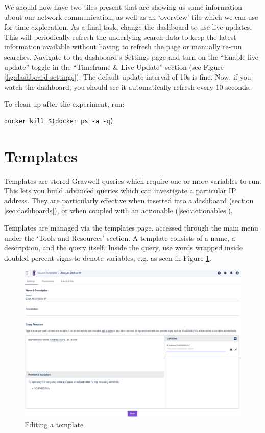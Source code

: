 We should now have two tiles present that are showing us some information
about our network communication, as well as an `overview' tile which we
can use for time exploration. As a final task, change the dashboard to use
live updates. This will periodically refresh the underlying search data
to keep the latest information available without having to refresh the
page or manually re-run searches. Navigate to the dashboard's Settings
page and turn on the ``Enable live update'' toggle in the ``Timeframe
\& Live Update'' section (see Figure \ref{fig:dashboard-settings}). The default update interval of 10s is fine.
Now, if you watch the dashboard, you should see it automatically refresh
every 10 seconds.

To clean up after the experiment, run:

\begin{Verbatim}[breaklines=true]
docker kill $(docker ps -a -q)
\end{Verbatim}

\clearpage
\section{Templates}
Templates are stored Gravwell queries which require one or more variables to run. This lets you build advanced queries which can investigate a particular IP address. They are particularly effective when inserted into a dashboard (section \ref{sec:dashboards}), or when coupled with an actionable (\ref{sec:actionables}).

Templates are managed via the templates page, accessed through the main menu under the `Tools and Resources' section. A template consists of a name, a description, and the query itself. Inside the query, use words wrapped inside doubled percent signs to denote variables, e.g.  as seen in Figure \ref{fig:template-editor}.

\begin{figure}
	\includegraphics[width=0.9\linewidth]{images/template-editor.png}
	\caption{Editing a template}
	\label{fig:template-editor}
\end{figure}

